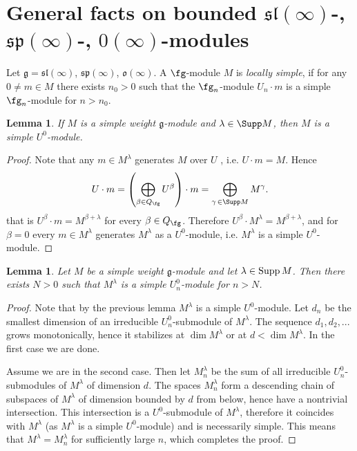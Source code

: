\documentclass[12pt]{amsart}
\def\gg{\mathfrak{g}}
\newtheorem{lem}[thm]{Lemma}
\begin{document}
\section{General facts on bounded $\mathfrak{sl}(\infty)$-, $\mathfrak{sp}(\infty)$-, $\mathfrak{0}(\infty)$-modules}

Let $\gg = \mathfrak{sl} (\infty)$, $ \mathfrak{sp} (\infty)$, $ \mathfrak{o} (\infty)$. A $\fg$-module $M$ is \emph{locally simple}, if for any $0\neq m\in M$ there exists $n_0>0$ such that the $\fg_n$-module $U_n\cdot m$ is a simple $\fg_n$-module for $n>n_0$.



\begin{lem} \label{l1}
If  $M$ is a simple weight $\gg$-module and  $\lambda \in \Supp  M$, then $M$ is a simple $U^0$-module. 
\end{lem}
\begin{proof}

Note that any $m \in  M^{\lambda}$ generates $M$ over $U$ , i.e. $U \cdot  m = M$. Hence
$$
U\cdot m=\left( \bigoplus_{\beta  \in {Q_\fg}}  U^{\beta}\right)  \cdot m =  \bigoplus_{\gamma\,  \in  \Supp M} M^{\gamma}.
$$
that is 
$U^{\beta} \cdot m  = M^{\beta + \lambda}$ for every $\beta  \in {Q_\fg}$. Therefore $U^{\beta} \cdot M^{\lambda}  = M^{\beta + \lambda}$, and for $\beta =0$ every $m \in  M^{\lambda}$ generates $M^{\lambda}$ as a $U^0$-module, i.e. $M^{\lambda}$ is a simple $U^0$-module.
\end{proof}

\begin{lem} \label{lem_u_o}
Let $M$ be a simple weight $\gg$-module and let $\lambda \in {\rm Supp}\, M$. Then there exists $N>0$ such that $M^{\lambda}$ is a simple $U^0_n$-module for $n>N$. 
\end{lem}
\begin{proof} Note that by the previous lemma  $M^{\lambda}$ is a simple $U^0$-module.
Let $d_n$ be  the smallest dimension of an irreducible $U^0_n$-submodule of $M^{\lambda}$. The sequence $d_1,d_2,...$ grows monotonically, hence it  stabilizes at $\dim M^{\lambda}$ or at $d < \dim M^{\lambda}$. In the first case we are done. 

Assume we are in the second case.  Then let $M_n^{\lambda}$ be the  sum of all irreducible $U^0_n$-submodules of $M^{\lambda}$ of dimension $d$. The spaces $M_n^{\lambda}$ form a descending chain of subspaces of $M^{\lambda}$ of dimension bounded by $d$ from below, hence have a nontrivial intersection. This intersection is a   $U^0$-submodule  of $M^{\lambda}$, therefore it coincides with   $M^{\lambda}$ (as $M^{\lambda}$ is a simple $U^0$-module) and is necessarily simple. This means that $M^{\lambda} = M_n^{\lambda}$ for sufficiently large $n$, which completes the proof. \end{proof}
\end{document}
